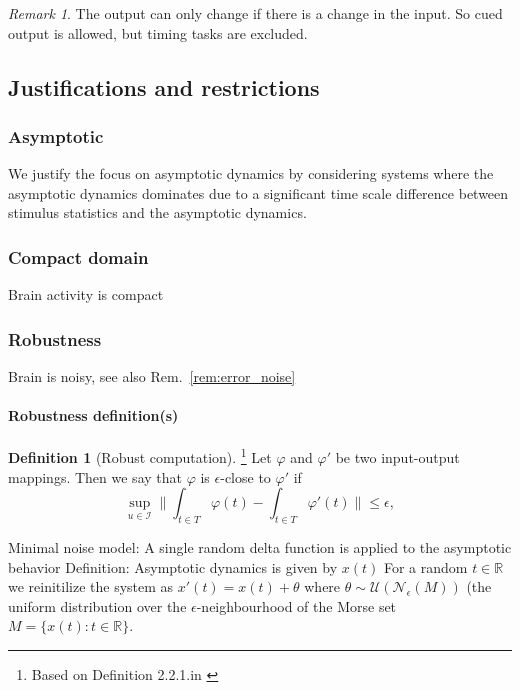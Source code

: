 \documentclass{scrartcl}
\theoremstyle{definition}
\newtheorem{definition}{Definition}
\theoremstyle{remark}
\newtheorem{remark}{Remark}
\newcommand{\reals}{\mathbb{R}}
\begin{document}
\begin{remark}
The output can only change if there is a change in the input. 
So cued output is allowed, but timing tasks are excluded.
\end{remark}

\subsection{Justifications and restrictions}\label{sec:jar}
\subsubsection{Asymptotic}
We justify the focus on asymptotic dynamics by considering systems where the asymptotic dynamics dominates due to a significant time scale difference between stimulus statistics and the asymptotic dynamics.

\subsubsection{Compact domain}
Brain activity is compact

\subsubsection{Robustness}
Brain is noisy, see also Rem.~\ref{rem:error_noise}

\paragraph{Robustness definition(s)}

\begin{definition}[Robust computation]\footnote{Based on Definition 2.2.1.in \citep{kuehn2015}}
 Let $\varphi$ and $\varphi'$ be two input-output mappings.
  Then we say that $\varphi$ is $\epsilon$-close to $\varphi'$ if
\begin{equation}\label{eq:error_def}
\sup_{u\in \mathcal{I}}\|\int_{t\in T}\varphi(t) - \int_{t\in T}\varphi'(t)\|  \leq \epsilon,
\end{equation}
\end{definition}


Minimal noise model: 
A single random delta function is applied to the asymptotic behavior
Definition:
Asymptotic dynamics is given by $x(t)$
For a random $t \in \reals$ we reinitilize the system as $x'(t)=x(t) + \theta$ where $\theta\sim \mathcal{U}(\mathcal{N}_\epsilon(M))$ (the uniform distribution over the $\epsilon$-neighbourhood of the Morse set $M=\{x(t)\colon t\in \reals\}$.
\end{document}
